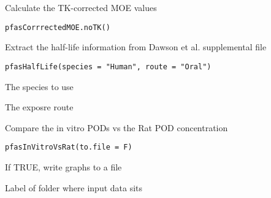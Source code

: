 \documentclass[letterpaper]{book}
\begin{document}
%
\begin{Description}\relax
Calculate the TK-corrected MOE values
\end{Description}
%
\begin{Usage}
\begin{verbatim}
pfasCorrrectedMOE.noTK()
\end{verbatim}
\end{Usage}
%
\begin{Description}\relax
Extract the half-life information from Dawson et al. supplemental file
\end{Description}
%
\begin{Usage}
\begin{verbatim}
pfasHalfLife(species = "Human", route = "Oral")
\end{verbatim}
\end{Usage}
%
\begin{Arguments}
\begin{ldescription}
\item[\code{species}] The species to use

\item[\code{route}] The exposre route
\end{ldescription}
\end{Arguments}
%
\begin{Description}\relax
Compare the in vitro PODs vs the Rat POD concentration
\end{Description}
%
\begin{Usage}
\begin{verbatim}
pfasInVitroVsRat(to.file = F)
\end{verbatim}
\end{Usage}
%
\begin{Arguments}
\begin{ldescription}
\item[\code{to.file}] If TRUE, write graphs to a file

\item[\code{data.version}] Label of folder where input data sits
\end{ldescription}
\end{Arguments}
\end{document}
